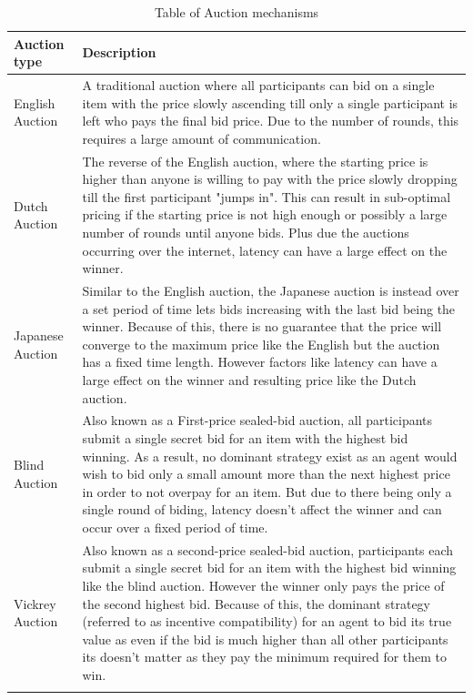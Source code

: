 \begin{longtable}{|p{3.5cm}|p{11cm}|} \hline
    \textbf{Auction type} & \textbf{Description} \\ \hline
    English Auction & A traditional auction where all participants can bid on a single item with the price slowly
        ascending till only a single participant is left who pays the final bid price. Due to the number of rounds,
        this requires a large amount of communication. \\ \hline

    Dutch Auction & The reverse of the English auction, where the starting price is higher than anyone is willing to
        pay with the price slowly dropping till the first participant "jumps in". This can result in sub-optimal pricing
        if the starting price is not high enough or possibly a large number of rounds until anyone bids. Plus due
        the auctions occurring over the internet, latency can have a large effect on the winner. \\ \hline

    Japanese Auction & Similar to the English auction, the Japanese auction is instead over a set period of time lets
        bids increasing with the last bid being the winner. Because of this, there is no guarantee that the price will
        converge to the maximum price like the English but the auction has a fixed time length. However factors like
        latency can have a large effect on the winner and resulting price like the Dutch auction. \\ \hline

    Blind Auction & Also known as a First-price sealed-bid auction, all participants submit a single secret bid for an
        item with the highest bid winning. As a result, no dominant strategy exist as an agent would wish to bid only a
        small amount more than the next highest price in order to not overpay for an item. But due to there being only
        a single round of biding, latency doesn't affect the winner and can occur over a fixed period of time. \\ \hline

    Vickrey Auction~\citep{vickrey} & Also known as a second-price sealed-bid auction, participants each submit
        a single secret bid for an item with the highest bid winning like the blind auction. However the winner only
        pays the price of the second highest bid. Because of this, the dominant strategy (referred to as incentive
        compatibility) for an agent to bid its true value as even if the bid is much higher than all other participants
        its doesn't matter as they pay the minimum required for them to win. \\ \hline
    \caption{Table of Auction mechanisms}
    \label{tab:auctions_descriptions}
\end{longtable}

